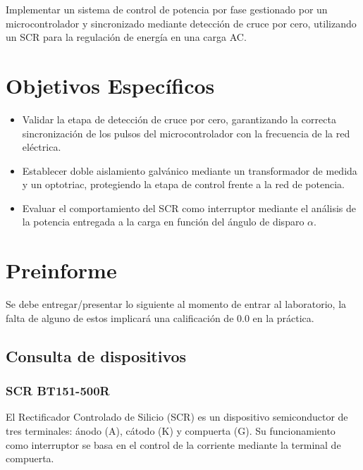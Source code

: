 \documentclass[12pt]{article}
\begin{document}
Implementar un sistema de control de potencia por fase gestionado por un
microcontrolador y sincronizado mediante detección de cruce por cero,
utilizando un SCR para la regulación de energía en una carga AC.

\section{Objetivos Específicos}

\begin{itemize}
    \item Validar la etapa de detección de cruce por cero, garantizando la
    correcta sincronización de los pulsos del microcontrolador con la
    frecuencia de la red eléctrica.

    \item Establecer doble aislamiento galvánico mediante un transformador de
    medida y un optotriac, protegiendo la etapa de control frente a la red de
    potencia.

    \item Evaluar el comportamiento del SCR como interruptor mediante el
    análisis de la potencia entregada a la carga en función del ángulo de
    disparo $\alpha$.
\end{itemize}


\newpage

\section{Preinforme}

Se debe entregar/presentar lo siguiente al momento de entrar al laboratorio,
la falta de alguno de estos implicará una calificación de 0.0 en la práctica.

\subsection{Consulta de dispositivos}

\subsubsection{SCR BT151-500R}

El Rectificador Controlado de Silicio (SCR) es un dispositivo semiconductor
de tres terminales: ánodo (A), cátodo (K) y compuerta (G). Su funcionamiento
como interruptor se basa en el control de la corriente mediante la terminal
de compuerta.
\end{document}
